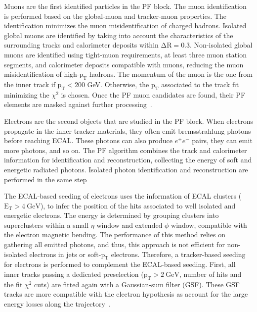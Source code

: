 Muons are the first identified particles in the PF block. The muon identification is performed based on the global-muon and tracker-muon properties. The identification minimizes the muon misidentification of charged hadrons. Isolated global muons are identified by taking into account the characteristics of the surrounding tracks and calorimeter deposits within $\mathrm{\Delta R}=0.3$. Non-isolated global muons are identified using tight-muon requirements, at least three muon station segments, and calorimeter deposits compatible with muons, reducing the muon misidentification of high-$\mathrm{p_{T}}$ hadrons. The momentum of the muon is the one from the inner track if $\mathrm{p_{T}}<200$ GeV. Otherwise, the $\mathrm{p_{T}}$ associated to the track fit minimizing the $\chi^{2}$ is chosen. Once the PF muon candidates are found, their PF elements are masked against further processing~\cite{cmspfalgo}.

Electrons are the second objects that are studied in the PF block. When electrons propagate in the inner tracker materials, they often emit bremsstrahlung photons before reaching ECAL. These photons can also produce $e^{+}e^{-}$ pairs, they can emit more photons, and so on. The PF algorithm combines the track and calorimeter information for identification and reconstruction, collecting the energy of soft and energetic radiated photons. Isolated photon identification and reconstruction are performed in the same step~\cite{cmspfalgo}

The ECAL-based seeding of electrons uses the information of ECAL clusters ($\mathrm{E_{T}>4~GeV}$), to infer the position of the hits associated to well isolated and energetic electrons. The energy is determined by grouping clusters into superclusters within a small $\eta$ window and extended $\phi$ window, compatible with the electron magnetic bending. The performance of this method relies on gathering all emitted photons, and thus, this approach is not efficient for non-isolated electrons in jets or soft-$\mathrm{p_{T}}$ electrons. Therefore, a tracker-based seeding for electrons is performed to complement the ECAL-based seeding. First, all inner tracks passing a dedicated preselection ($\mathrm{p_{T}>2~GeV}$, number of hits and the fit $\chi^{2}$ cuts) are fitted again with a Gaussian-sum filter (GSF). These GSF tracks are more compatible with the electron hypothesis as account for the large energy losses along the trajectory~\cite{cmspfalgo}. 

